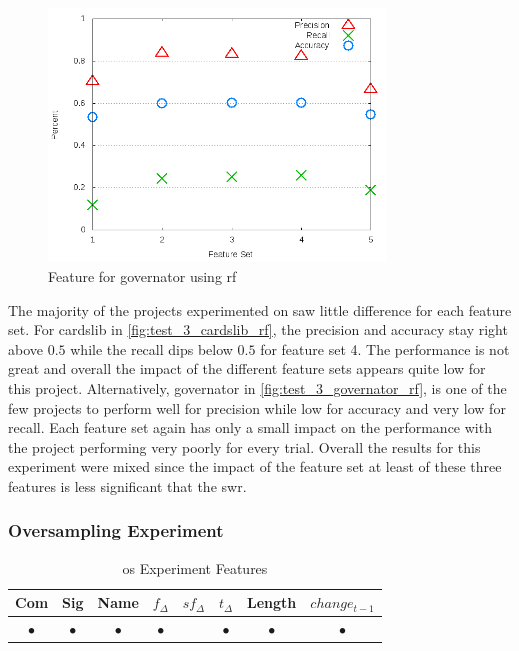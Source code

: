 \begin{figure}[!ht]
    \centering
        \includegraphics[width=0.8\textwidth]{images/rf/test_3/governator_sample_range}
    \caption{Feature for governator using \gls{rf}}
    \label{fig:test_3_governator_rf}
\end{figure}

The majority of the projects experimented on saw little difference for each feature set. For cardslib in \autoref{fig:test_3_cardslib_rf}, the precision and accuracy stay right above $0.5$ while the recall dips below $0.5$ for feature set 4. The performance is not great and overall the impact of the different feature sets appears quite low for this project. Alternatively, governator in \autoref{fig:test_3_governator_rf}, is one of the few projects to perform well for precision while low for accuracy and very low for recall. Each feature set again has only a small impact on the performance with the project performing very poorly for every trial. Overall the results for this experiment were mixed since the impact of the feature set at least of these three features is less significant that the \gls{swr}.

\subsubsection{Oversampling Experiment}
\label{sec:oversampling_experiment_rf}

\begin{table}[h]
\begin{center}

    \begin{tabular}{|c|c|c|c|c|c|c|c|}
        \hline
        Com & Sig & Name & $f_{\Delta}$ & $sf_{\Delta}$ & $t_\Delta$ & Length & $change_{t-1}$ \\
         \hline
        $\bullet$ & $\bullet$ & $\bullet$ & $\bullet$ & & $\bullet$ & $\bullet$ & $\bullet$ \\ \hline
    \end{tabular}
    \caption{\gls{os} Experiment Features}
    \label{tab:rf_oversampling_features}
\end{center}

\end{table}

